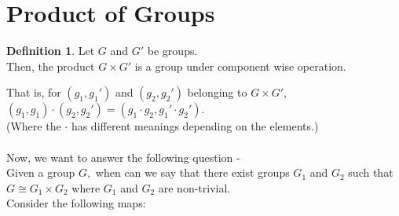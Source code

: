 \documentclass[12 pt, a4paper, toc=graduated, oneside]{article}
\theoremstyle{definition}
\newtheorem{defn}{Definition}
\begin{document}
\section{Product of Groups}
\begin{defn}
	Let $G$ and $G'$ be groups.\\
	Then, the product $G \times G'$ is a group under component wise operation.
\end{defn}
That is, for $(g_1, g_1')$ and $(g_2, g_2')$ belonging to $G \times G',$ $(g_1, g_1)\cdot(g_2, g_2') = (g_1\cdot g_2, g_1' \cdot g_2').$\\
(Where the $\cdot$ has different meanings depending on the elements.)\\~\\
%
Now, we want to answer the following question - \\
Given a group $G,$ when can we say that there exist groups $G_1$ and $G_2$ such that $G \cong G_1 \times G_2$ where $G_1$ and $G_2$ are non-trivial.\\
Consider the following maps:

\begin{center}

\end{center}
\end{document}
